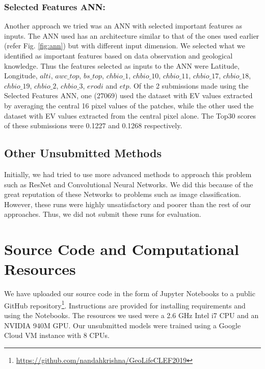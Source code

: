 \documentclass[runningheads]{llncs}
\begin{document}
\subsubsection{Selected Features ANN:}
Another approach we tried was an ANN with selected important features as inputs. The ANN used has an architecture similar to that of the ones used earlier (refer Fig. \ref{fig:ann}) but with different input dimension. We selected what we identified as important features based on data observation and geological knowledge. Thus the features selected as inputs to the ANN were Latitude, Longitude, $alti$, $awc\_top$, $bs\_top$, $chbio\_1$, $chbio\_10$, $chbio\_11$, $chbio\_17$, $chbio\_18$, $chbio\_19$, $chbio\_2$, $chbio\_3$, $erodi$ and $etp$.
\newline
\newline
\noindent Of the 2 submissions made using the Selected Features ANN, one (27069) used the dataset with EV values extracted by averaging the central 16 pixel values of the patches, while the other used the dataset with EV values extracted from the central pixel alone. The Top30 scores of these submissions were 0.1227 and 0.1268 respectively.
\subsection{Other Unsubmitted Methods}
Initially, we had tried to use more advanced methods to approach this problem such as ResNet and Convolutional Neural Networks. We did this because of the great reputation of these Networks to problems such as image classification. However, these runs were highly unsatisfactory and poorer than the rest of our approaches. Thus, we did not submit these runs for evaluation.

\section{Source Code and Computational Resources}
We have uploaded our source code in the form of Jupyter Notebooks to a public GitHub repository\footnote{\url{https://github.com/nandahkrishna/GeoLifeCLEF2019}}. Instructions are provided for installing requirements and using the Notebooks. The resources we used were a 2.6 GHz Intel i7 CPU and an NVIDIA 940M GPU. Our unsubmitted models were trained using a Google Cloud VM instance with 8 CPUs.
\end{document}
